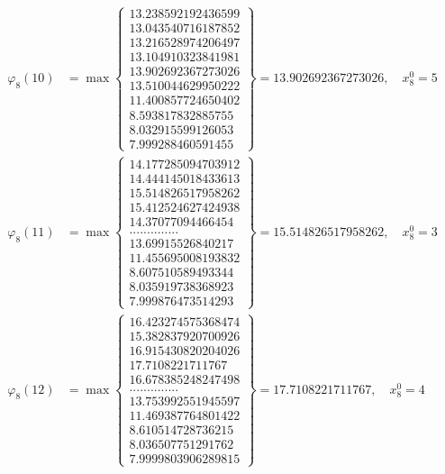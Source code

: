 \documentclass{article}
\begin{document}
\begin{align*}
  
  
  
\varphi_{8}(10) &= \max \left\{ \begin{array}{c}
13.238592192436599 \\
 13.043540716187852 \\
 13.216528974206497 \\
 13.104910323841981 \\
 13.902692367273026 \\
 13.510044629950222 \\
 11.400857724650402 \\
 8.593817832885755 \\
 8.032915599126053 \\
 7.999288460591455
\end{array} \right\} = 13.902692367273026, \quad x_{8}^0 = 5\\
  
  
  
  
\varphi_{8}(11) &= \max \left\{ \begin{array}{c}
14.177285094703912 \\
 14.444145018433613 \\
 15.514826517958262 \\
 15.412524627424938 \\
 14.37077094466454 \\
 .............. \\
 13.69915526840217 \\
 11.455695008193832 \\
 8.607510589493344 \\
 8.035919738368923 \\
 7.999876473514293
\end{array} \right\} = 15.514826517958262, \quad x_{8}^0 = 3\\
  
  
  
  
\varphi_{8}(12) &= \max \left\{ \begin{array}{c}
16.423274575368474 \\
 15.382837920700926 \\
 16.915430820204026 \\
 17.7108221711767 \\
 16.678385248247498 \\
 .............. \\
 13.753992551945597 \\
 11.469387764801422 \\
 8.610514728736215 \\
 8.036507751291762 \\
 7.9999803906289815
\end{array} \right\} = 17.7108221711767, \quad x_{8}^0 = 4\\
  

\end{align*}
\end{document}
